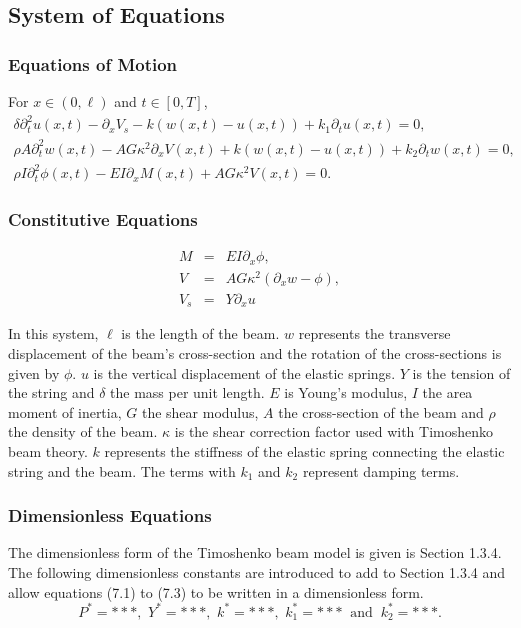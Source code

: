 \documentclass[../../main.tex]{subfiles}
\begin{document}
\subsection{System of Equations}
\subsubsection{Equations of Motion}
For $x \in (0,\ell)$ and $t \in [0,T]$,
\begin{eqnarray}
\delta \partial^2_{t} u(x,t) - \partial_x V_s - k(w(x,t) - u(x,t))+ k_1 \partial_t u(x,t) = 0, \\
\rho A \partial^2_{t}w(x,t) - AG\kappa^2 \partial_xV(x,t) + k(w(x,t)-u(x,t)) + k_2\partial_t w(x,t) = 0,\\
\rho I \partial^2_{t}\phi(x,t) - EI \partial_{x} M(x,t) + AG\kappa^2V(x,t) = 0. 
\end{eqnarray}

\subsubsection{Constitutive Equations}
\begin{eqnarray}
        M &=& EI\partial_x \phi,\label{TGT_3}\\
        V &=& AG\kappa^2(\partial_x w - \phi)\label{TGT_4},\\
        V_s & = & Y\partial_x u
\end{eqnarray}

In this system, $\ell$ is the length of the beam. $w$ represents the transverse displacement of the beam's cross-section and the rotation of the cross-sections is given by $\phi$. $u$ is the vertical displacement of the elastic springs. $Y$ is the tension of the string and $\delta$ the mass per unit length. $E$ is Young's modulus, $I$ the area moment of inertia, $G$ the shear modulus, $A$ the cross-section of the beam and $\rho$ the density of the beam. $\kappa$ is the shear correction factor used with Timoshenko beam theory. $k$ represents the stiffness of the elastic spring connecting the elastic string and the beam. The terms with $k_1$ and $k_2$ represent damping terms.\\

\subsubsection{Dimensionless Equations}
The dimensionless form of the Timoshenko beam model is given is Section 1.3.4. The following dimensionless constants are introduced to add to Section 1.3.4 and allow equations (7.1) to (7.3) to be written in a dimensionless form.
\[P^* = ***, \,\, Y^* = ***, \,\, k^* = ***, \,\, k_1^* = *** \ \text{ and } \ k_2^* = ***.\]
\end{document}

